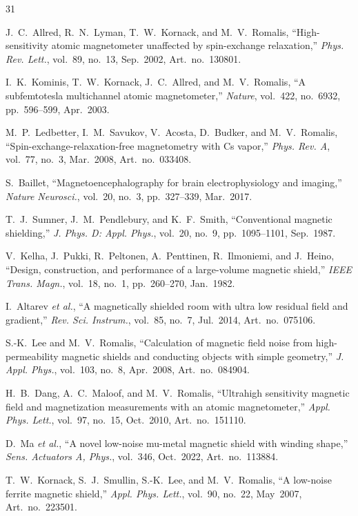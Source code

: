 \documentclass[letterpaper,journal]{IEEEtran}
\begin{document}
\begin{thebibliography}{31}

J.~C.~Allred, R.~N.~Lyman, T.~W.~Kornack, and M.~V.~Romalis,
``High-sensitivity atomic magnetometer unaffected by spin-exchange relaxation,''
\textit{Phys. Rev. Lett.}, vol.~89, no.~13, Sep.~2002, Art.~no.~130801.

I.~K.~Kominis, T.~W.~Kornack, J.~C.~Allred, and M.~V.~Romalis,
``A subfemtotesla multichannel atomic magnetometer,''
\textit{Nature}, vol.~422, no.~6932, pp.~596--599, Apr.~2003.

M.~P.~Ledbetter, I.~M.~Savukov, V.~Acosta, D.~Budker, and M.~V.~Romalis,
``Spin-exchange-relaxation-free magnetometry with Cs vapor,''
\textit{Phys. Rev. A}, vol.~77, no.~3, Mar.~2008, Art.~no.~033408.

S.~Baillet,
``Magnetoencephalography for brain electrophysiology and imaging,''
\textit{Nature Neurosci.}, vol.~20, no.~3, pp.~327--339, Mar.~2017.

T.~J.~Sumner, J.~M.~Pendlebury, and K.~F.~Smith,
``Conventional magnetic shielding,''
\textit{J. Phys. D: Appl. Phys.}, vol.~20, no.~9, pp.~1095--1101, Sep.~1987.

V.~Kelha, J.~Pukki, R.~Peltonen, A.~Penttinen, R.~Ilmoniemi, and J.~Heino,
``Design, construction, and performance of a large-volume magnetic shield,''
\textit{IEEE Trans. Magn.}, vol.~18, no.~1, pp.~260--270, Jan.~1982.

I.~Altarev \textit{et al.},
``A magnetically shielded room with ultra low residual field and gradient,''
\textit{Rev. Sci. Instrum.}, vol.~85, no.~7, Jul.~2014, Art.~no.~075106.

S.-K.~Lee and M.~V.~Romalis,
``Calculation of magnetic field noise from high-permeability magnetic shields and conducting objects with simple geometry,''
\textit{J. Appl. Phys.}, vol.~103, no.~8, Apr.~2008, Art.~no.~084904.

H.~B.~Dang, A.~C.~Maloof, and M.~V.~Romalis,
``Ultrahigh sensitivity magnetic field and magnetization measurements with an atomic magnetometer,''
\textit{Appl. Phys. Lett.}, vol.~97, no.~15, Oct.~2010, Art.~no.~151110.

D.~Ma \textit{et al.},
``A novel low-noise mu-metal magnetic shield with winding shape,''
\textit{Sens. Actuators A, Phys.}, vol.~346, Oct.~2022, Art.~no.~113884.

T.~W.~Kornack, S.~J.~Smullin, S.-K.~Lee, and M.~V.~Romalis,
``A low-noise ferrite magnetic shield,''
\textit{Appl. Phys. Lett.}, vol.~90, no.~22, May~2007, Art.~no.~223501.


\end{thebibliography}
\end{document}
